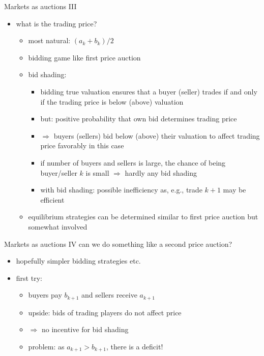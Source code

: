 \documentclass[bigger]{beamer}
\newcommand{\Ra}{\Rightarrow} \newcommand{\ra}{\rightarrow} \newcommand{\Lra}{\Leftrightarrow}
\begin{document}
\begin{frame}[label={sec:org97a7019}]{Markets as auctions III}
\begin{itemize}
\item what is the trading price?
\begin{itemize}
\item most natural: \((a_k+b_k)/2\)
\item bidding game like first price auction
\item bid shading:
\begin{itemize}
\item bidding true valuation ensures that a buyer (seller) trades if and only if the trading price is below (above) valuation
\item but: positive probability that own bid determines trading price
\item \(\Ra\) buyers (sellers) bid below (above) their valuation to affect trading price favorably in this case
\item if number of buyers and sellers is large, the chance of being buyer/seller \(k\) is small \(\Ra\) hardly any bid shading
\item with bid shading: possible inefficiency as, e.g., trade \(k+1\) may be efficient
\end{itemize}
\item equilibrium strategies can be determined similar to first price auction but somewhat involved
\end{itemize}
\end{itemize}
\end{frame}

\begin{frame}[label={sec:org8cbd572}]{Markets as auctions IV}
can we do something like a second price auction?
\begin{itemize}
\item hopefully simpler bidding strategies etc.
\item first try:
\begin{itemize}
\item buyers pay \(b_{k+1}\) and sellers receive \(a_{k+1}\)
\item upside: bids of trading players do not affect price
\item \(\Ra\) no incentive for bid shading
\item problem: as \(a_{k+1}>b_{k+1}\), there is a deficit!
\end{itemize}
\end{itemize}
\end{frame}
\end{document}
